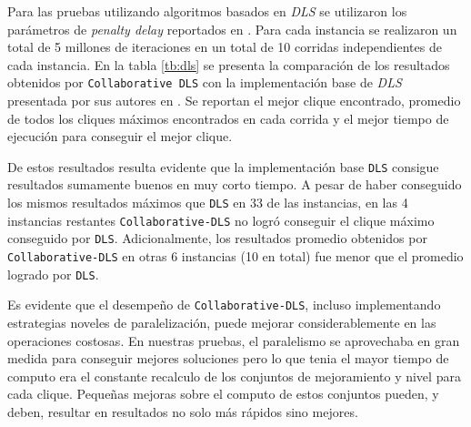 \documentclass[conference]{IEEEtran}
\begin{document}
Para las pruebas utilizando algoritmos basados en \emph{DLS} se
utilizaron los parámetros de \emph{penalty delay} reportados en
\cite{dynamicl}. Para cada instancia se realizaron un total de 5
millones de iteraciones en un total de 10 corridas independientes de
cada instancia. En la tabla \ref{tb:dls} se presenta la comparación de
los resultados obtenidos por \texttt{Collaborative DLS} con la
implementación base de \emph{DLS} presentada por sus autores en
\cite{dynamicl}. Se reportan el mejor clique encontrado, promedio de
todos los cliques máximos encontrados en cada corrida y el mejor
tiempo de ejecución para conseguir el mejor clique.

De estos resultados resulta evidente que la implementación base
\texttt{DLS} consigue resultados sumamente buenos en muy corto
tiempo. A pesar de haber conseguido los mismos resultados máximos que
\texttt{DLS} en 33 de las instancias, en las 4 instancias restantes
\texttt{Collaborative-DLS} no logró conseguir el clique máximo
conseguido por \texttt{DLS}. Adicionalmente, los resultados promedio
obtenidos por \texttt{Collaborative-DLS} en otras 6 instancias (10 en
total) fue menor que el promedio logrado por \texttt{DLS}.

Es evidente que el desempeño de \texttt{Collaborative-DLS}, incluso
implementando estrategias noveles de paralelización, puede mejorar
considerablemente en las operaciones costosas. En nuestras pruebas,
el paralelismo se aprovechaba en gran medida para conseguir mejores
soluciones pero lo que tenia el mayor tiempo de computo era el
constante recalculo de los conjuntos de mejoramiento y nivel para cada
clique. Pequeñas mejoras sobre el computo de estos conjuntos pueden, y
deben, resultar en resultados no solo más rápidos sino mejores.
\end{document}
